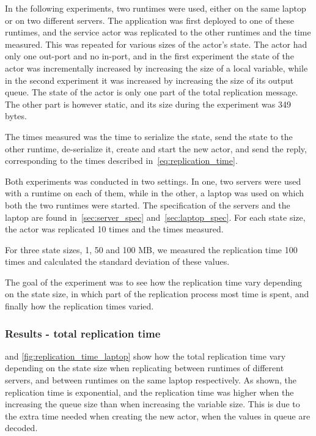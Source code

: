 \documentclass{cslthse-msc}
\begin{document}
In the following experiments, two runtimes were used, either on the same laptop or on two different servers. The application was first deployed to one of these runtimes, and the service actor was replicated to the other runtimes and the time measured. This was repeated for various sizes of the actor's state. The actor had only one out-port and no in-port, and in the first experiment the state of the actor was incrementally increased by increasing the size of a local variable, while in the second experiment it was increased by increasing the size of its output queue. The state of the actor is only one part of the total replication message. The other part is however static, and its size during the experiment was 349 bytes.

The times measured was the time to serialize the state, send the state to the other runtime, de-serialize it, create and start the new actor, and send the reply, corresponding to the times described in~\cref{eq:replication_time}.

Both experiments was conducted in two settings. In one, two servers were used with a runtime on each of them, while in the other, a laptop was used on which both the two runtimes were started. The specification of the servers and the laptop are found in~\cref{sec:server_spec} and~\cref{sec:laptop_spec}. For each state size, the actor was replicated 10 times and the times measured.

For three state sizes, 1, 50 and 100 MB, we measured the replication time 100 times and calculated the standard deviation of these values.

The goal of the experiment was to see how the replication time vary depending on the state size, in which part of the replication process most time is spent, and finally how the replication times varied.

\subsubsection*{Results - total replication time}
 and \cref{fig:replication_time_laptop} show how the total replication time vary depending on the state size when replicating between runtimes of different servers, and between runtimes on the same laptop respectively. As shown, the replication time is exponential, and the replication time was higher when the increasing the queue size than when increasing the variable size. This is due to the extra time needed when creating the new actor, when the values in queue are decoded. %
\end{document}
